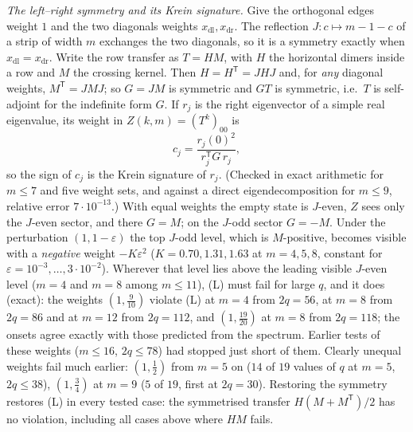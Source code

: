 \documentclass[11pt]{amsart}
\theoremstyle{definition}
\theoremstyle{remark}
\begin{document}
\emph{The left--right symmetry and its Krein signature.} Give the orthogonal edges weight $1$ and
the two diagonals weights $x_{\mathrm{dl}}, x_{\mathrm{dr}}$. The reflection $J\colon c \mapsto m - 1 - c$
of a strip of width $m$ exchanges the two diagonals, so it is a symmetry exactly when
$x_{\mathrm{dl}} = x_{\mathrm{dr}}$. Write the row transfer as $T = HM$, with $H$ the horizontal
dimers inside a row and $M$ the crossing kernel. Then $H = H^{\mathsf T} = JHJ$ and, for
\emph{any} diagonal weights, $M^{\mathsf T} = JMJ$; so $G = JM$ is symmetric and $GT$ is symmetric,
i.e.\ $T$ is self-adjoint for the indefinite form $G$. If $r_j$ is the right eigenvector of a simple
real eigenvalue, its weight in $Z(k, m) = (T^k)_{00}$ is
\[
  c_j = \frac{r_j(0)^2}{r_j^{\mathsf T} G\, r_j},
\]
so the sign of $c_j$ is the Krein signature of $r_j$. (Checked in exact arithmetic for $m \le 7$
and five weight sets, and against a direct eigendecomposition for $m \le 9$, relative error
$7\cdot10^{-13}$.) With equal weights the empty state is $J$-even, $Z$ sees only the $J$-even
sector, and there $G = M$; on the $J$-odd sector $G = -M$. Under the perturbation $(1, 1 - \varepsilon)$
the top $J$-odd level, which is $M$-positive, becomes visible with a \emph{negative} weight
$-K\varepsilon^2$ ($K = 0.70, 1.31, 1.63$ at $m = 4, 5, 8$, constant for
$\varepsilon = 10^{-3}, \dots, 3\cdot10^{-2}$). Wherever that level lies above the leading visible
$J$-even level ($m = 4$ and $m = 8$ among $m \le 11$), (L) must fail for large $q$, and it does
(exact): the weights $(1, \tfrac{9}{10})$ violate (L) at $m = 4$ from $2q = 56$, at $m = 8$ from
$2q = 86$ and at $m = 12$ from $2q = 112$, and $(1, \tfrac{19}{20})$ at $m = 8$ from $2q = 118$; the
onsets agree exactly with those predicted from the spectrum. Earlier tests of these weights
($m \le 16$, $2q \le 78$) had stopped just short of them. Clearly unequal weights fail much
earlier: $(1, \tfrac12)$ from $m = 5$ on ($14$ of $19$ values of $q$ at $m = 5$, $2q \le 38$),
$(1, \tfrac34)$ at $m = 9$ ($5$ of $19$, first at $2q = 30$). Restoring the symmetry restores (L)
in every tested case: the symmetrised transfer $H(M + M^{\mathsf T})/2$ has no violation, including
all cases above where $HM$ fails.
\end{document}
